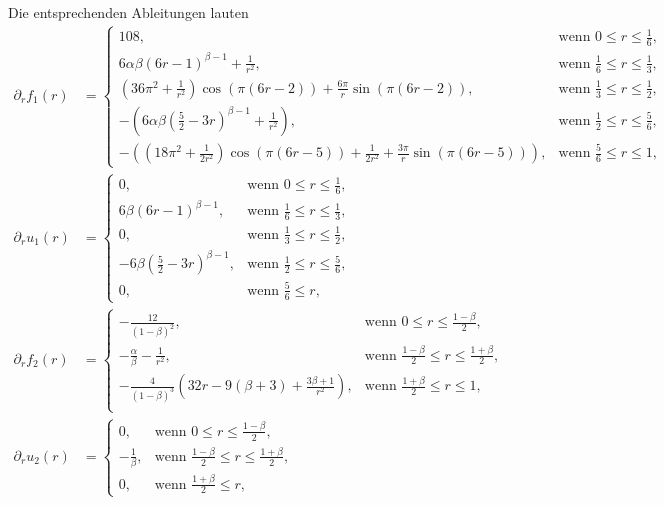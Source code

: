 Die entsprechenden Ableitungen lauten
\begin{align*}
  \partial_r f_1(r) &= 
  \begin{cases}
    108,&
    \text{wenn }0\leq r\leq\frac{1}{6},\\
    6\alpha\beta(6r-1)^{\beta-1} +\frac{1}{r^2}, &
    \text{wenn } \frac{1}{6}\leq r\leq\frac{1}{3},\\
    (36\pi^2+\frac{1}{r^2})\cos(\pi(6r-2))+
    \frac{6\pi}{r}\sin(\pi(6r-2)), &
    \text{wenn } \frac{1}{3}\leq r\leq\frac{1}{2},\\
    -\left(6\alpha\beta\left( \frac{5}{2}-3r \right)^{\beta-1}+
    \frac{1}{r^2}\right),&
    \text{wenn } \frac{1}{2}\leq r\leq\frac{5}{6},\\
    -\left( \left( 18\pi^2+\frac{1}{2r^2} \right)\cos(\pi(6r-5))
    +\frac{1}{2r^2}+\frac{3\pi}{r}\sin(\pi(6r-5))\right),
    &\text{wenn } \frac{5}{6}\leq r\leq 1,
  \end{cases}\\
  \partial_r u_1(r) &= 
  \begin{cases}
    0,&\text{wenn }0\leq r\leq\frac{1}{6},\\
    6\beta(6r-1)^{\beta-1}, &\text{wenn } \frac{1}{6}\leq r\leq\frac{1}{3},\\
    0, &\text{wenn } \frac{1}{3}\leq r\leq\frac{1}{2},\\
    -6\beta\left( \frac{5}{2}-3r \right)^{\beta-1},&
    \text{wenn } \frac{1}{2}\leq r\leq\frac{5}{6},\\
    0,&\text{wenn } \frac{5}{6}\leq r,
  \end{cases}\\
  \partial_r f_2(r) &= 
  \begin{cases}
    -\frac{12}{(1-\beta)^2},&\text{wenn }0\leq r\leq\frac{1-\beta}{2},\\
    -\frac{\alpha}{\beta}-\frac{1}{r^2},&
    \text{wenn } \frac{1-\beta}{2}\leq r\leq \frac{1+\beta}{2},\\
    -\frac{4}{(1-\beta)^3}\left( 32r-9(\beta+3)+\frac{3\beta+1}{r^2} \right),&
    \text{wenn } \frac{1+\beta}{2}\leq r\leq 1,\\
  \end{cases}\\
  \partial_r u_2(r) &= 
  \begin{cases}
    0,&\text{wenn }0\leq r\leq\frac{1-\beta}{2},\\
    -\frac{1}{\beta},&
    \text{wenn } \frac{1-\beta}{2}\leq r\leq \frac{1+\beta}{2},\\
    0,&\text{wenn } \frac{1+\beta}{2}\leq r,

\end{cases}
\end{align*}
